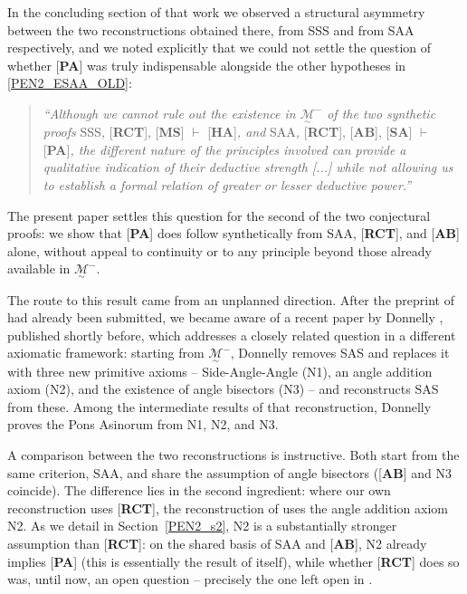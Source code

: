 \documentclass[11pt,a4paper]{article}
\theoremstyle{definition}
\theoremstyle{remark}
\numberwithin{equation}{section}
\newcommand{\MG}{\underset{\sim}{\mathcal{M}}}
\begin{document}
In the concluding section of that work we observed a structural asymmetry between the two
reconstructions obtained there, from SSS and from SAA respectively, and we noted explicitly
that we could not settle the question of whether [\textbf{PA}] was truly indispensable
alongside the other hypotheses in \eqref{PEN2_ESAA_OLD}:
\begin{quote}
\emph{``Although we cannot rule out the existence in $\MG^{-}$ of the two synthetic proofs}
SSS\emph{,} [\textbf{RCT}], [\textbf{MS}] \emph{$\vdash$} [\textbf{HA}]\emph{, and}
SAA\emph{,} [\textbf{RCT}], [\textbf{AB}], [\textbf{SA}] \emph{$\vdash$}
[\textbf{PA}]\emph{, the different nature of the principles involved can provide a
qualitative indication of their deductive strength [...] while not allowing us to establish
a formal relation of greater or lesser deductive power.''}
\end{quote}
The present paper settles this question for the second of the two conjectural proofs: we
show that [\textbf{PA}] does follow synthetically from SAA, [\textbf{RCT}], and [\textbf{AB}]
alone, without appeal to continuity or to any principle beyond those already available in
$\MG^{-}$.

The route to this result came from an unplanned direction. After the preprint of
\cite{Volpe2026I} had already been submitted, we became aware of a recent paper by Donnelly
\cite{Donnelly2025}, published shortly before, which addresses a closely related question in
a different axiomatic framework: starting from $\MG^{-}$, Donnelly removes SAS and replaces
it with three new primitive axioms -- Side-Angle-Angle (N1), an angle addition axiom (N2),
and the existence of angle bisectors (N3) -- and reconstructs SAS from these. Among the
intermediate results of that reconstruction, Donnelly proves the Pons Asinorum from N1, N2,
and N3.

A comparison between the two reconstructions is instructive. Both start from the same
criterion, SAA, and share the assumption of angle bisectors ([\textbf{AB}] and N3 coincide).
The difference lies in the second ingredient: where our own reconstruction uses
[\textbf{RCT}], the reconstruction of \cite{Donnelly2025} uses the angle addition axiom N2.
As we detail in Section~\ref{PEN2_s2}, N2 is a substantially stronger assumption than
[\textbf{RCT}]: on the shared basis of SAA and [\textbf{AB}], N2 already implies
[\textbf{PA}] (this is essentially the result of \cite{Donnelly2025} itself), while whether
[\textbf{RCT}] does so was, until now, an open question -- precisely the one left open in
\cite{Volpe2026I}.
\end{document}
